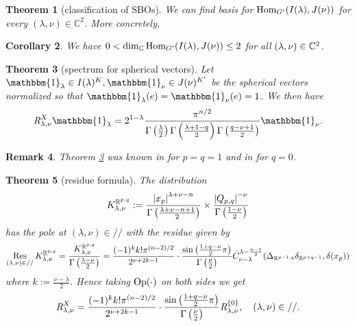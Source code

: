 \documentclass[12pt]{article} %
\newtheorem{theorem}{Theorem}
\newcommand{\Hom}{\mbox{\normalfont Hom}}
\newtheorem{remark}[theorem]{Remark}
\newtheorem{corollary}[theorem]{Corollary}
\theoremstyle{definition}
\theoremstyle{exampstyle} \newtheorem{examp}[theorem]{Theorem}
\newcommand{\Op}{\mbox{\normalfont Op}}
\newcommand{\Res}{\operatorname{Res}\displaylimits}
\newcommand{\OpR}{\mbox{\it R}}
\renewcommand{\Q}{Q_{p,q}}
\begin{document}
\begin{theorem}[classification of SBOs]
		We can find basis for $\Hom_{G'}(I(\lambda),J(\nu))$ for every $(\lambda,\nu)\in \mathbb{C}^2$. More concretely,
\end{theorem}
\begin{corollary}\label{cor:clasiff}
	We have $0<\dim_{\C}\Hom_{G'}(I(\lambda),J(\nu))\le2$ for all $(\lambda,\nu)\in\mathbb{C}^2$.
\end{corollary}
\begin{theorem}[spectrum for spherical vectors]\label{thm:spherical}
	Let $\mathbbm{1}_\lambda\in I(\lambda)^K,\mathbbm{1}_\nu\in J(\nu)^{K'}$ be the spherical vectors normalized so that $\mathbbm{1}_\lambda(e)=\mathbbm{1}_\nu(e)=1$. We then have
\[ \OpR^X_{\lambda, \nu} \mathbbm{1}_{\lambda} = 2^{1 -
\lambda} \frac{\pi^{n / 2}}{\Gamma \left( \frac{\lambda}{2} \right)
\Gamma \left(  \frac{\lambda + 1-q}{2} \right) \Gamma \left(
\frac{q - \nu + 1}{2} \right)} \mathbbm{1}_{\nu}. \]
\end{theorem}
\begin{remark}
	Theorem \ref{thm:spherical} was known in \cite{bernstein2004estimates,clerc2011generalized} for $p=q=1$ and in \cite{kobayashi2015symmetry} for $q=0$.
\end{remark}
\begin{theorem}[residue formula]
		The distribution
		\[K_{\lambda,\nu}^{\mathbb{R}^{p,q}}:=\frac{\myabs{x_p}^{\lambda+\nu-n}}{\Gamma\left( \frac{\lambda+\nu-n+1}{2} \right)}\times
		\frac{\myabs{\Q}^{-\nu}}{\Gamma\left( \frac{1-\nu}{2} \right)}\]
		has the pole at $(\lambda,\nu)\in//$ with the residue given by
		\[\Res_{(\lambda,\nu)\in//}K_{\lambda,\nu}^{\mathbb{R}^{p,q}}=\frac{K_{\lambda,\nu}^{\mathbb{R}^{p,q}}}{\Gamma\left( \frac{\lambda-\nu}{2} \right)}
			=\frac{ (- 1)^k k!\pi^{(n - 2) / 2} 
		}{2^{ \nu + 2 k-1}}\cdot  \frac{\sin\left( \frac{1+q-\nu}{2}\pi \right)}{\Gamma\left( \frac{\nu}{2} \right)}
	\tilde{C}_{\nu - \lambda}^{\lambda - \frac{n
  	- 1}{2}} ({\Delta}_{\mathbb{R}^{p-1,q}} {\delta}_{\mathbb{R}^{p+q-1}}, \delta (x_p))
		\]
		where $k:=\frac{\nu-\lambda}{2}$.
		Hence taking $\Op(\cdot)$ on both sides we get
  \[\OpR_{\lambda,\nu}^X  = \frac{ (- 1)^k k!\pi^{(n - 2) / 2} 
		}{2^{ \nu + 2 k-1}}\cdot  \frac{\sin\left( \frac{1+q-\nu}{2}\pi \right)}{\Gamma\left( \frac{\nu}{2} \right)}
     \OpR_{\lambda,\nu}^{ \left\{ 0 \right\} },\quad(\lambda,\nu)\in// . \]
	\end{theorem}
\end{document}
